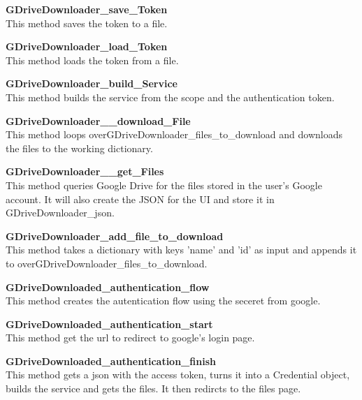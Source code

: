 \textbf{GDriveDownloader\_save\_Token} \\
This method saves the token to a file.

\textbf{GDriveDownloader\_load\_Token} \\
This method loads the token from a file.

\textbf{GDriveDownloader\_build\_Service} \\
This method builds the service from the scope and the authentication token.

\textbf{GDriveDownloader\_\_download\_File} \\
This method loops overGDriveDownloader\_files\_to\_download and downloads the files to the working dictionary. 

\textbf{GDriveDownloader\_\_get\_Files} \\
This method queries Google Drive for the files stored in the user's Google account. It will also create the JSON for the UI and store it in GDriveDownloader\_json.   

\textbf{GDriveDownloader\_add\_file\_to\_download} \\
This method takes a dictionary with keys 'name' and 'id' as input and appends it to overGDriveDownloader\_files\_to\_download.

\textbf{GDriveDownloaded\_authentication\_flow} \\
This method creates the autentication flow using the seceret from google.

\textbf{GDriveDownloaded\_authentication\_start} \\
This method get the url to redirect to google's login page.

\textbf{GDriveDownloaded\_authentication\_finish} \\
This method gets a json with the access token, turns it into a Credential object, builds the service and gets the files. It then redircts to the files page. 